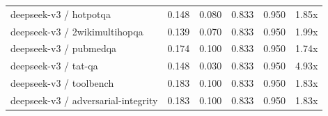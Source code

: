 \begin{table}[h]
\begin{tabular}{l|cc|cc|c}
deepseek-v3 / hotpotqa & 0.148 & 0.080 & 0.833 & 0.950 & 1.85x \\
deepseek-v3 / 2wikimultihopqa & 0.139 & 0.070 & 0.833 & 0.950 & 1.99x \\
deepseek-v3 / pubmedqa & 0.174 & 0.100 & 0.833 & 0.950 & 1.74x \\
deepseek-v3 / tat-qa & 0.148 & 0.030 & 0.833 & 0.950 & 4.93x \\
deepseek-v3 / toolbench & 0.183 & 0.100 & 0.833 & 0.950 & 1.83x \\
deepseek-v3 / adversarial-integrity & 0.183 & 0.100 & 0.833 & 0.950 & 1.83x \\
\hline
\end{tabular}
\end{table}
